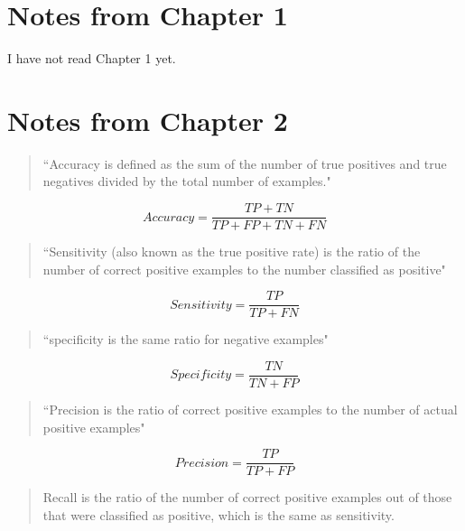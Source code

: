 \documentclass[12pt]{article}
\begin{document}
\maketitle

\section{Notes from Chapter 1}
I have not read Chapter 1 yet.

\section{Notes from Chapter 2}
\begin{verse}
``Accuracy is defined as the sum of the number of true positives and true negatives divided by the total number of examples."
\end{verse}

\begin{equation}
Accuracy = \frac{TP + TN}{TP + FP + TN + FN}
\end{equation}

\begin{verse}
``Sensitivity (also known as the true positive rate) is the ratio of the number of correct positive examples to the number classified as positive"
\end{verse}

\begin{equation}
Sensitivity = \frac{TP}{TP + FN}
\end{equation}

\begin{verse}
``specificity is the same ratio for negative examples"
\end{verse}

\begin{equation}
Specificity = \frac{TN}{TN + FP}
\end{equation}

\begin{verse}
``Precision is the ratio of correct positive examples to the number of actual positive examples"
\end{verse}

\begin{equation}
Precision = \frac{TP}{TP + FP}
\end{equation}

\begin{verse}
Recall is the ratio of the number of correct positive examples out of those that were classified as positive, which is the same as sensitivity.
\end{verse}
\end{document}
